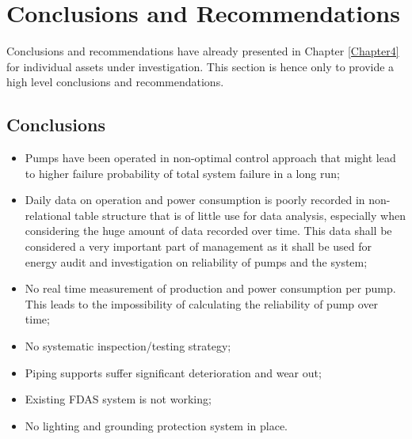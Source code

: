 
\chapter{Conclusions and Recommendations} %
\label{Chapter7}
Conclusions and recommendations have already presented in Chapter \ref{Chapter4} for individual assets under investigation. This section is hence only to provide a high level conclusions and recommendations.
\section{Conclusions}
\begin{itemize}
\item Pumps have been operated in non-optimal control approach that might lead to higher failure probability of total system failure in a long run;
\item Daily data on operation and power consumption is poorly recorded in non-relational table structure that is of little use for data analysis, especially when considering the huge amount of data recorded over time. This data shall be considered a very important part of management as it shall be used for energy audit and investigation on reliability of pumps and the system;
\item No real time measurement of production and power consumption per pump. This leads to the impossibility of calculating the reliability of pump over time;
\item No systematic inspection/testing strategy;
\item Piping supports suffer significant deterioration and wear out;
\item Existing FDAS system is not working;
\item No lighting and grounding protection system in place.
\end{itemize}

